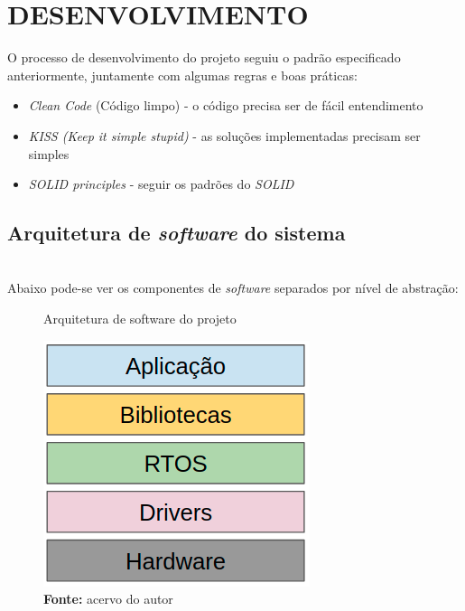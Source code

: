 \documentclass[times, twoside, watermark]{artigo}
\begin{document}

\section{DESENVOLVIMENTO}

O processo de desenvolvimento do projeto seguiu o padrão especificado anteriormente,
juntamente com algumas regras e boas práticas:

\begin{itemize}
\item \textit{Clean Code} (Código limpo) - o código precisa ser de fácil 
entendimento\cite{martin2009clean}
\item \textit{KISS (Keep it simple stupid)} - as soluções implementadas precisam ser 
simples\cite{martin2018clean}
\item \textit{SOLID principles} - seguir os padrões do \textit{SOLID}
\cite{martin2002agile}
\end{itemize}

\subsection{Arquitetura de \textit{software} do sistema}\hfill\\
Abaixo pode-se ver os componentes de \textit{software} separados por nível de abstração:

\begin{figure}[H]
    \centering
    \caption{Arquitetura de software do projeto}
    \includegraphics[width=0.7\linewidth]{images/arch.png}
    \caption*{\newline\textbf{Fonte:} acervo do autor}
\end{figure}
\end{document}
